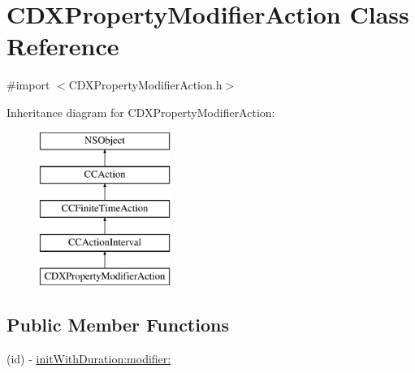 \hypertarget{interface_c_d_x_property_modifier_action}{\section{C\-D\-X\-Property\-Modifier\-Action Class Reference}
\label{interface_c_d_x_property_modifier_action}
}


{\ttfamily \#import $<$C\-D\-X\-Property\-Modifier\-Action.\-h$>$}

Inheritance diagram for C\-D\-X\-Property\-Modifier\-Action\-:\begin{figure}[H]
\begin{center}
\leavevmode
\includegraphics[height=5.000000cm]{interface_c_d_x_property_modifier_action}
\end{center}
\end{figure}
\subsection*{Public Member Functions}
\begin{DoxyCompactItemize}
\item 
(id) -\/ \hyperlink{interface_c_d_x_property_modifier_action_a24e48541ff1b6b81dbab1a4f7f024746}{init\-With\-Duration\-:modifier\-:}
\end{DoxyCompactItemize}
